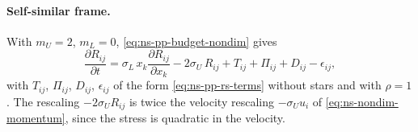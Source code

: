 \documentclass{article}
\begin{document}
\paragraph{Self-similar frame.}
With $m_U = 2$, $m_L = 0$, \eqref{eq:ns-pp-budget-nondim} gives
\begin{equation}\label{eq:ns-pp-rs-rate-nondim}
  \frac{\partial R_{ij}}{\partial t}
  = \sigma_L\, x_k \frac{\partial R_{ij}}{\partial x_k}
  - 2\sigma_U\, R_{ij}
  + T_{ij} + \Pi_{ij} + D_{ij} - \epsilon_{ij} ,
\end{equation}
with $T_{ij}$, $\Pi_{ij}$, $D_{ij}$, $\epsilon_{ij}$ of the form
\eqref{eq:ns-pp-rs-terms} without stars and with $\rho = 1$. The rescaling
$-2\sigma_U R_{ij}$ is twice the velocity rescaling $-\sigma_U u_i$ of
\eqref{eq:ns-nondim-momentum}, since the stress is quadratic in the velocity.
\end{document}
